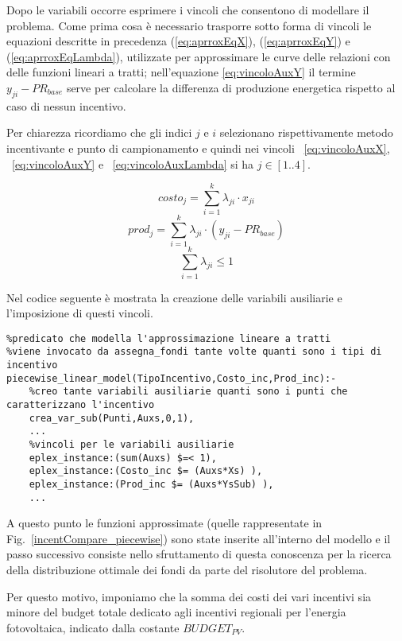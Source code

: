 \documentclass[12pt,a4paper,openright,twoside]{report}
\begin{document}
Dopo le variabili occorre esprimere i vincoli che consentono di modellare il problema. Come prima cosa è necessario trasporre sotto forma di vincoli le equazioni descritte in precedenza (\ref{eq:aprroxEqX}), (\ref{eq:aprroxEqY}) e (\ref{eq:aprroxEqLambda}), utilizzate per approssimare le curve delle relazioni con delle funzioni lineari a tratti; nell'equazione \ref{eq:vincoloAuxY} il termine $y_{ji}-PR_{base}$ serve per calcolare la differenza di produzione energetica rispetto al caso di nessun incentivo.

Per chiarezza ricordiamo che gli indici $j$ e $i$ selezionano rispettivamente metodo incentivante e punto di campionamento e quindi nei vincoli ~\ref{eq:vincoloAuxX}, ~\ref{eq:vincoloAuxY} e ~\ref{eq:vincoloAuxLambda} si ha $j \in [1..4]$.

\begin{equation} \label{eq:vincoloAuxX}
	costo_j = \sum_{i=1}^k \lambda_{ji} \cdot x_{ji} 
\end{equation}
\begin{equation} \label{eq:vincoloAuxY}
	prod_j = \sum_{i=1}^k \lambda_{ji} \cdot (y_{ji}-PR_{base}) 
\end{equation}
\begin{equation} \label{eq:vincoloAuxLambda}
	\sum_{i=1}^k \lambda_{ji} \leq 1
\end{equation}

Nel codice seguente è mostrata la creazione delle variabili ausiliarie e l'imposizione di questi vincoli.
\begin{lstlisting}
%predicato che modella l'approssimazione lineare a tratti
%viene invocato da assegna_fondi tante volte quanti sono i tipi di incentivo
piecewise_linear_model(TipoIncentivo,Costo_inc,Prod_inc):-
	%creo tante variabili ausiliarie quanti sono i punti che caratterizzano l'incentivo
	crea_var_sub(Punti,Auxs,0,1),
	...
	%vincoli per le variabili ausiliarie
	eplex_instance:(sum(Auxs) $=< 1),
	eplex_instance:(Costo_inc $= (Auxs*Xs) ),
	eplex_instance:(Prod_inc $= (Auxs*YsSub) ),
	...
\end{lstlisting}

A questo punto le funzioni approssimate (quelle rappresentate in Fig.~\ref{incentCompare_piecewise}) sono state inserite all'interno del modello e il passo successivo consiste nello sfruttamento di questa conoscenza per la ricerca della distribuzione ottimale dei fondi da parte del risolutore del problema.

Per questo motivo, imponiamo che la somma dei costi dei vari incentivi sia minore del budget totale dedicato agli incentivi regionali per l'energia fotovoltaica, indicato dalla costante $BUDGET_{PV}$.
\end{document}

